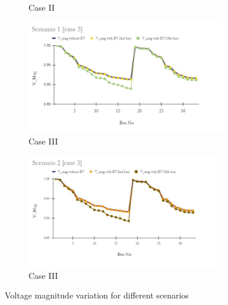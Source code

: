\begin{figure}[!h]
\begin{subfigure}{.5\textwidth}
			\caption{Case II}
			\label{fig:LF2b}
		\end{subfigure}
		\begin{subfigure}{.5\textwidth}
			\centering
			\includegraphics[width=.97\linewidth,height= 4.95cm]{./Figures/sc1_case3}
			\caption{Case III}
			\label{fig:LFc}
		\end{subfigure}
		\begin{subfigure}{.5\textwidth}
			\centering
			\includegraphics[width=.97\linewidth,height= 4.95cm]{./Figures/sc2_case3}
			\caption{Case III}
			\label{fig:LF2c}
		\end{subfigure}
		\caption{ Voltage magnitude variation for different scenarios }
		\label{fig:loadprofile-scenario1}
	\end{figure} 
	
	

		
	
	
	